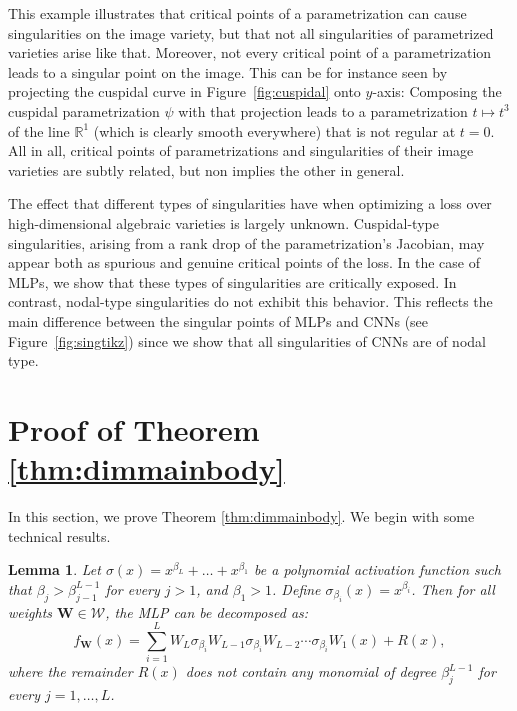 \documentclass{article} %
\theoremstyle{plain}%
\newtheorem{lemm}[thm]{Lemma}
\theoremstyle{definition}
\theoremstyle{remark}
\begin{document}
This example illustrates that critical points of a parametrization can cause singularities on the image variety, but that not all singularities of parametrized varieties arise like that.
Moreover, not every critical point of a parametrization leads to a singular point on the image. This can be for instance seen by projecting the cuspidal curve in Figure~\ref{fig:cuspidal} onto $y$-axis: Composing the cuspidal parametrization $\psi$ with that projection leads to a parametrization $t \mapsto t^3$ of the line $\mathbb{R}^1$ (which is clearly smooth everywhere) that is not regular at $t=0$. 
All in all, critical points of parametrizations and singularities of their image varieties are subtly related, but non implies the other in general.

The effect that different types of singularities have when optimizing a loss over high-dimensional algebraic varieties is largely unknown.
Cuspidal-type singularities, arising from a  rank drop of the parametrization's Jacobian, may appear both as spurious \citep{trager2019pure} and genuine critical points of the loss. 
In the case of MLPs, we show that these types of singularities are critically exposed.
In contrast, nodal-type singularities do not exhibit this 
behavior. 
This reflects the main difference between the singular points of MLPs and CNNs (see 
Figure~\ref{fig:singtikz}) since we show that all singularities of CNNs are of nodal type.

\section{Proof of Theorem \ref{thm:dimmainbody}} \label{app:dimProofMLP}
In this section, we prove Theorem \ref{thm:dimmainbody}. We begin with some technical results. 

\begin{lemm}
\label{lemm:sparse_activation}
Let $\sigma(x) = x^{\beta_L} + \dots + x^{\beta_1}$ be a polynomial activation function such that $\beta_j > \beta_{j-1}^{L-1}$ for every $j > 1$, and $\beta_1 > 1$. Define $\sigma_{\beta_i}(x) = x^{\beta_i}$. Then for all weights $\mathbf{W} \in \mathcal{W}$, the MLP can be decomposed as: 
\begin{equation}
    f_\mathbf{W}(x) = \label{eq:decomp_unique_R(x)_enhanced}
    \sum_{i=1}^L W_L \sigma_{\beta_i} W_{L-1} \sigma_{\beta_i} W_{L-2} \cdots \sigma_{\beta_i} W_1(x) + R(x),
\end{equation}
where the remainder $R(x)$ does not contain any monomial of degree $\beta_j^{L-1}$ for every $j = 1, \dots, L$.
\end{lemm}
\end{document}
